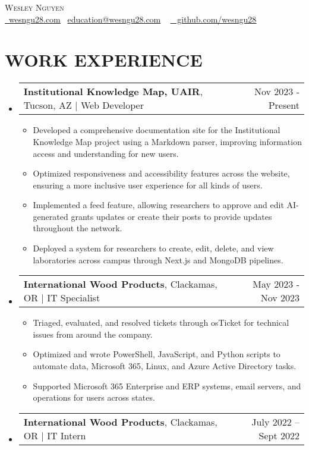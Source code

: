 \documentclass[letterpaper,11pt]{article}
\makeatletter
\newcommand{\resumeItem}[1]{
  \item\small{
    {#1 \vspace{-2pt}}
  }
}
\newcommand{\resumeProjectHeading}[2]{
    \item
    \begin{tabular*}{0.97\textwidth}{l@{\extracolsep{\fill}}r}
      \small#1 & #2 \\
    \end{tabular*}\vspace{-7pt}
}
\newcommand{\resumeSubHeadingListStart}{\begin{itemize}[leftmargin=0.15in, label={}]}
\newcommand{\resumeSubHeadingListEnd}{\end{itemize}}
\newcommand{\resumeItemListStart}{\begin{itemize}}
\newcommand{\resumeItemListEnd}{\end{itemize}\vspace{-5pt}}
\makeatother
\begin{document}

\begin{center}
    {\LARGE \scshape Wesley Nguyen }\ \\ \vspace{4pt}\href{https://wesngu28.com}{\raisebox{-0.2\height}\ \underline{wesngu28.com}} {\raisebox{-0.2\height}\  \underline{education@wesngu28.com}} ~
    \href{https://github.com/wesngu28}{\raisebox{-0.2\height}\ \underline{ github.com/wesngu28}}
    
    \vspace{-6pt}
\end{center}

\section{WORK EXPERIENCE}
  \resumeSubHeadingListStart
    \resumeProjectHeading
      {\textbf{Institutional Knowledge Map, UAIR}, Tucson, AZ $|$ {Web Developer}}{Nov 2023 - Present}
      \resumeItemListStart
        \resumeItem{Developed a comprehensive documentation site for the Institutional Knowledge Map project using a Markdown parser, improving information access and understanding for new users.}
        \resumeItem{Optimized responsiveness and accessibility features across the website, ensuring a more inclusive user experience for all kinds of users.}
        \resumeItem{Implemented a feed feature, allowing researchers to approve and edit AI-generated grants updates or create their posts to provide updates throughout the network.}
        \resumeItem{Deployed a system for researchers to create, edit, delete, and view laboratories across campus through Next.js and MongoDB pipelines.}
      \resumeItemListEnd
    \resumeProjectHeading
      {\textbf{International Wood Products}, Clackamas, OR $|$ {IT Specialist}}{May 2023 - Nov 2023}
      \resumeItemListStart
        \resumeItem{Triaged, evaluated, and resolved tickets through osTicket for technical issues from around the company.}
        \resumeItem{Optimized and wrote PowerShell, JavaScript, and Python scripts to automate data, Microsoft 365, Linux, and Azure Active Directory tasks.}
        \resumeItem{Supported Microsoft 365 Enterprise and ERP systems, email servers, and operations for users across states.}
      \resumeItemListEnd
    \resumeProjectHeading
      {\textbf{International Wood Products}, Clackamas, OR $|$ {IT Intern}}{July 2022 -- Sept 2022}
   
  \resumeSubHeadingListEnd
\end{document}
